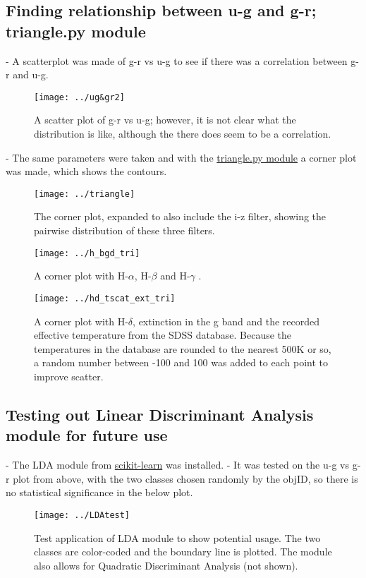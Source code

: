 \documentclass[12pt]{article}
\begin{document}
\subsection{Finding relationship between u-g and g-r; triangle.py module}
- A scatterplot was made of g-r vs u-g to see if there was a correlation between g-r and u-g. 
\begin{figure}
\texttt{[image: ../ug\&gr2]}\\
\caption{A scatter plot of g-r vs u-g; however, it is not clear what the distribution is like, although the there does seem to be a correlation.}
\end{figure}
- The same parameters were taken and with the \href{https://github.com/dfm/triangle.py}{triangle.py module} a corner plot was made, which shows the contours.\\
\begin{figure}
\texttt{[image: ../triangle]}\\
\caption{The corner plot, expanded to also include the i-z filter, showing the pairwise distribution of these three filters.}
\end{figure}
\begin{figure}
\texttt{[image: ../h\_bgd\_tri]}\\
\caption{A corner plot with H-$\alpha$, H-$\beta$ and H-$\gamma$ .}
\end{figure}
\begin{figure}
\texttt{[image: ../hd\_tscat\_ext\_tri]}\\
\caption{A corner plot with H-$\delta$, extinction in the g band and the recorded effective temperature from the SDSS database. Because the temperatures in the database are rounded to the nearest 500K or so, a random number between -100 and 100 was added to each point to improve scatter.}
\end{figure}
\subsection{Testing out Linear Discriminant Analysis module for future use}
- The LDA module from \href{http://scikit-learn.org/stable/install.html}{scikit-learn} was installed.
- It was tested on the u-g vs g-r plot from above, with the two classes chosen randomly by the objID, so there is no statistical significance in the below plot.\\
\begin{figure}
\texttt{[image: ../LDAtest]}\\
\caption{Test application of LDA module to show potential usage. The two classes are color-coded and the boundary line is plotted. The module also allows for Quadratic Discriminant Analysis (not shown).}
\end{figure}
\end{document}
